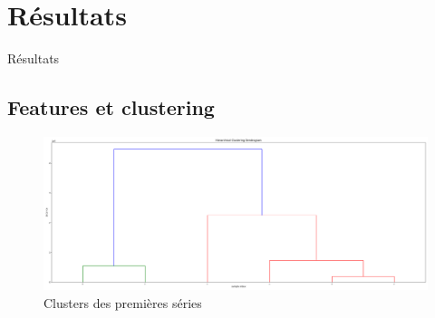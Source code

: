 \documentclass{beamer}
\begin{document}
\section{Résultats}\label{sec:résultats}
\begin{frame}{Résultats}
    \subsection{Features et clustering}\label{subsec:features-et-clustering}
    \begin{figure}[H]
        \centering
        \includegraphics[width=\textwidth]{features_clusters.png}
        \caption{Clusters des premières séries}
        \label{fig:features_clusters}
    \end{figure}
\end{frame}

\begin{frame}
\end{frame}
\end{document}
